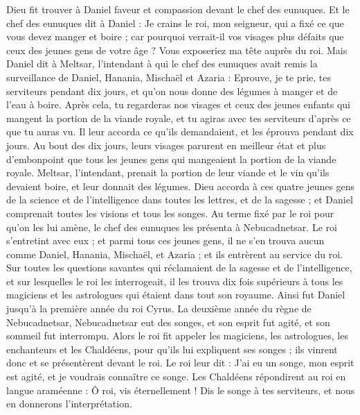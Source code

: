 \begin{multicols}{2}
Dieu fit trouver à Daniel faveur et compassion devant le chef des eunuques.
Et le chef des eunuques dit à Daniel : Je crains le roi, mon seigneur, qui a fixé ce que vous devez manger et boire ; car pourquoi verrait-il vos visages plus défaits que ceux des jeunes gens de votre âge ? Vous exposeriez ma tête auprès du roi.
Mais Daniel dit à Meltsar, l’intendant à qui le chef des eunuques avait remis la surveillance de Daniel, Hanania, Mischaël et Azaria :
Eprouve, je te prie, tes serviteurs pendant dix jours, et qu'on nous donne des légumes à manger et de l'eau à boire.
Après cela, tu regarderas nos visages et ceux des jeunes enfants qui mangent la portion de la viande royale, et tu agiras avec tes serviteurs d’après ce que tu auras vu.
Il leur accorda ce qu’ils demandaient, et les éprouva pendant dix jours.
Au bout des dix jours, leurs visages parurent en meilleur état et plus d'embonpoint que tous les jeunes gens qui mangeaient la portion de la viande royale.
Meltsar, l’intendant, prenait la portion de leur viande et le vin qu'ils devaient boire, et leur donnait des légumes.
Dieu accorda à ces quatre jeunes gens de la science et de l'intelligence dans toutes les lettres, et de la sagesse ; et Daniel comprenait toutes les visions et tous les songes.
Au terme fixé par le roi pour qu’on les lui amène, le chef des eunuques les présenta à Nebucadnetsar.
Le roi s'entretint avec eux ; et parmi tous ces jeunes gens, il ne s'en trouva aucun comme Daniel, Hanania, Mischaël, et Azaria ; et ils entrèrent au service du roi.
Sur toutes les questions savantes qui réclamaient de la sagesse et de l’intelligence, et sur lesquelles le roi les interrogeait, il les trouva dix fois supérieurs à tous les magiciens et les astrologues qui étaient dans tout son royaume.
Ainsi fut Daniel jusqu'à la première année du roi Cyrus.
\VerseOne{}La deuxième année du règne de Nebucadnetsar, Nebucadnetsar eut des songes, et son esprit fut agité, et son sommeil fut interrompu.
Alors le roi fit appeler les magiciens, les astrologues, les enchanteurs et les Chaldéens, pour qu’ils lui expliquent ses songes ; ils vinrent donc et se présentèrent devant le roi.
Le roi leur dit : J'ai eu un songe, mon esprit est agité, et je voudrais connaître ce songe.
Les Chaldéens répondirent au roi en langue araméenne : Ô roi, vis éternellement ! Dis le songe à tes serviteurs, et nous en donnerons l'interprétation.

\end{multicols}

